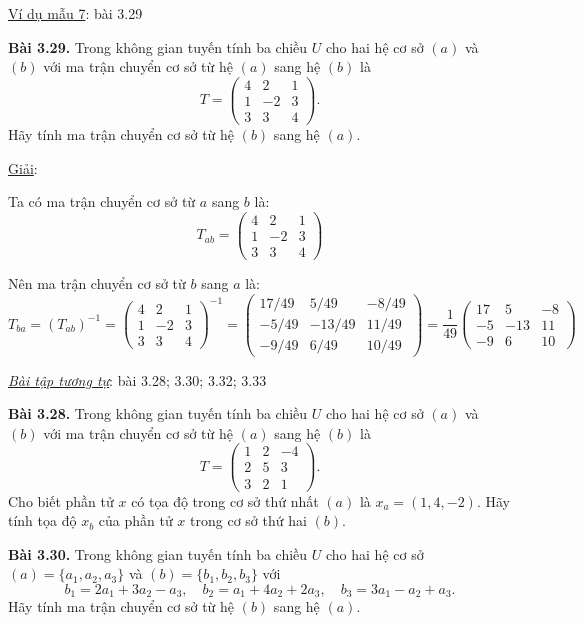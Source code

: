 \documentclass[12pt,a4paper]{article}
\begin{document}
\medskip
\noindent\underline{Ví dụ mẫu 7}: bài 3.29

\medskip
\noindent\textbf{Bài 3.29.} Trong không gian tuyến tính ba chiều $U$ cho hai hệ cơ sở $(a)$ và $(b)$ với ma trận chuyển cơ sở từ hệ $(a)$ sang hệ $(b)$ là
\[
T=\begin{pmatrix}4 & 2 & 1\\ 1 & -2 & 3\\ 3 & 3 & 4\end{pmatrix}.
\]
Hãy tính ma trận chuyển cơ sở từ hệ $(b)$ sang hệ $(a)$.

\medskip
\noindent\underline{Giải}:

Ta có ma trận chuyển cơ sở từ $a$ sang $b$ là:
\[
T_{ab}=\begin{pmatrix}4 & 2 & 1\\ 1 & -2 & 3\\ 3 & 3 & 4\end{pmatrix}
\]

Nên ma trận chuyển cơ sở từ $b$ sang $a$ là:
\[
T_{ba}=(T_{ab})^{-1}=\begin{pmatrix}4 & 2 & 1\\ 1 & -2 & 3\\ 3 & 3 & 4\end{pmatrix}^{-1}
=\begin{pmatrix}17/49 & 5/49 & -8/49\\ -5/49 & -13/49 & 11/49\\ -9/49 & 6/49 & 10/49\end{pmatrix}
=\frac{1}{49}\begin{pmatrix}17 & 5 & -8\\ -5 & -13 & 11\\ -9 & 6 & 10\end{pmatrix}
\]

\medskip
\noindent\textit{\underline{Bài tập tương tự}}: bài 3.28; 3.30; 3.32; 3.33

\medskip
\noindent\textbf{Bài 3.28.} Trong không gian tuyến tính ba chiều $U$ cho hai hệ cơ sở $(a)$ và $(b)$ với ma trận chuyển cơ sở từ hệ $(a)$ sang hệ $(b)$ là
\[
T=\begin{pmatrix}1 & 2 & -4\\ 2 & 5 & 3\\ 3 & 2 & 1\end{pmatrix}.
\]
Cho biết phần tử $x$ có tọa độ trong cơ sở thứ nhất $(a)$ là $x_a=(1,4,-2)$. Hãy tính tọa độ $x_b$ của phần tử $x$ trong cơ sở thứ hai $(b)$.

\medskip
\noindent\textbf{Bài 3.30.} Trong không gian tuyến tính ba chiều $U$ cho hai hệ cơ sở $(a)=\{a_1,a_2,a_3\}$ và $(b)=\{b_1,b_2,b_3\}$ với
\[
b_1=2a_1+3a_2-a_3,\quad b_2=a_1+4a_2+2a_3,\quad b_3=3a_1-a_2+a_3.
\]
Hãy tính ma trận chuyển cơ sở từ hệ $(b)$ sang hệ $(a)$.
\end{document}
